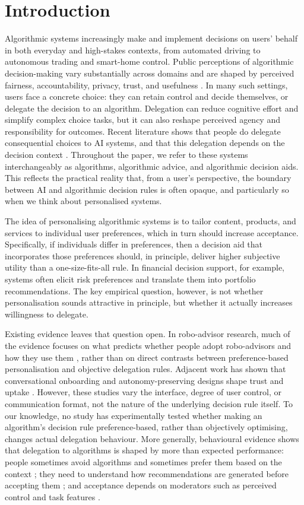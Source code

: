 \documentclass[a4paper, 12pt, fleqn]{article}
\theoremstyle{hypstyle}
\begin{document}
\section{Introduction}\label{sec:intro}
Algorithmic systems increasingly make and implement decisions on users’ behalf in both everyday and high-stakes contexts, from automated driving to autonomous trading and smart-home control. Public perceptions of algorithmic decision-making vary substantially across domains and are shaped by perceived fairness, accountability, privacy, trust, and usefulness \citep{Aysolmaz2023}. In many such settings, users face a concrete choice: they can retain control and decide themselves, or delegate the decision to an algorithm. Delegation can reduce cognitive effort and simplify complex choice tasks, but it can also reshape perceived agency and responsibility for outcomes. Recent literature shows that people do delegate consequential choices to AI systems, and that this delegation depends on the decision context \citep{Candrian2022}. Throughout the paper, we refer to these systems interchangeably as algorithms, algorithmic advice, and algorithmic decision aids. This reflects the practical reality that, from a user's perspective, the boundary between AI and algorithmic decision rules is often opaque, and particularly so when we think about personalised systems.

The idea of personalising algorithmic systems is to tailor content, products, and services to individual user preferences, which in turn should increase acceptance. Specifically, if individuals differ in preferences, then a decision aid that incorporates those preferences should, in principle, deliver higher subjective utility than a one-size-fits-all rule. In financial decision support, for example, systems often elicit risk preferences and translate them into portfolio recommendations. The key empirical question, however, is not whether personalisation sounds attractive in principle, but whether it actually increases willingness to delegate.

Existing evidence leaves that question open. In robo-advisor research, much of the evidence focuses on what predicts whether people adopt robo-advisors and how they use them \citep[for example,][]{Mahmud2025}, rather than on direct contrasts between preference-based personalisation and objective delegation rules. Adjacent work has shown that conversational onboarding and autonomy-preserving designs shape trust and uptake \citep{Hildebrand2021,Fink2024}. However, these studies vary the interface, degree of user control, or communication format, not the nature of the underlying decision rule itself. To our knowledge, no study has experimentally tested whether making an algorithm's decision rule preference-based, rather than objectively optimising, changes actual delegation behaviour. More generally, behavioural evidence shows that delegation to algorithms is shaped by more than expected performance: people sometimes avoid algorithms and sometimes prefer them based on the context \citep{Dietvorst2018,Logg2019}; they need to understand how recommendations are generated before accepting them \citep{Yeomans2019}; and acceptance depends on moderators such as perceived control and task features \citep{Mahmud2022,Chugunova2022}.
\end{document}

